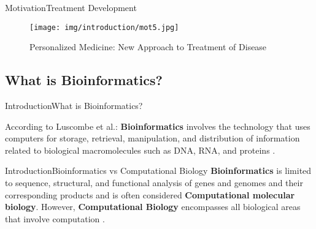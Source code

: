 \documentclass[10pt]{beamer}
\newcommand{\1}{
        	\setbeamertemplate{background}{
        		\texttt{[image: img/1]}
        		\tikz[overlay] \fill[fill opacity=0.75,fill=white] (0,0) rectangle (-\paperwidth,\paperheight);
        	}
}
\begin{document}
\begin{frame}{Motivation}{Treatment Development}
	\begin{figure}[]
		\centering
		\texttt{[image: img/introduction/mot5.jpg]}
		\label{img:mot2}
		\caption{Personalized Medicine: New Approach to Treatment of Disease}
	\end{figure}
\end{frame}

\subsection{What is Bioinformatics?}

\begin{frame}{Introduction}{What is Bioinformatics?}
	
	According to Luscombe et al.: \textbf{Bioinformatics} involves the technology that uses computers for storage, retrieval, manipulation, and distribution of information related to biological macromolecules such as DNA, RNA, and proteins \cite{luscombe2001bioinformatics}.
	
\end{frame}

\begin{frame}{Introduction}{Bioinformatics vs Computational Biology}
	\textbf{Bioinformatics} is limited to sequence, structural, and functional analysis of genes and genomes and their corresponding products and is often considered \textbf{Computational
		molecular biology}. However, \textbf{Computational Biology} encompasses all biological areas that involve computation \cite{xiong2006essential}.
\end{frame}

\end{document}

